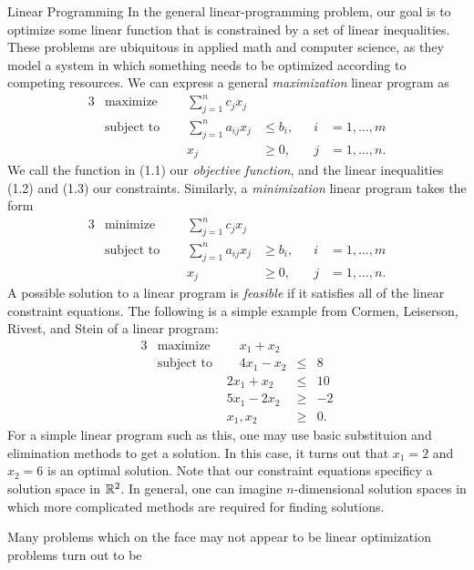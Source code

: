 \begin{section}{Linear Programming}
	In the general linear-programming problem, our goal is to optimize some linear function that 
	is constrained by a set of linear inequalities. These problems are ubiquitous in applied math 
	and computer science, as they model a system in which something needs to be optimized according 
	to competing resources. We can express a general \emph{maximization} linear program as
	\begin{alignat}{3}
		& \text{maximize } & \sum_{j=1}^{n} c_{j} x_{j}& \\
		& \text{subject to } \quad & \sum_{j=1}^{n} a_{ij} x_{j} & \leq b_{i}, & i & = 1, \dots 
		, m \\
				&& x_{j} & \geq 0, \quad & j & = 1, \dots, n.
	\end{alignat}
	We call the function in (1.1) our \emph{objective function}, and the linear inequalities (1.2) 
	and (1.3) our constraints. Similarly, a \emph{minimization} linear program takes the form
	\begin{alignat}{3}
		& \text{minimize } & \sum_{j=1}^{n} c_{j} x_{j}& \\
		& \text{subject to } \quad & \sum_{j=1}^{n} a_{ij} x_{j} & \geq b_{i}, & i & = 1, \dots 
		, m \\
				&& x_{j} & \geq 0, \quad & j & = 1, \dots, n.
	\end{alignat}
	A possible solution to a linear program is \emph{feasible} if it satisfies all of the linear 
	constraint equations. The following is a simple example from Cormen, Leiserson, Rivest, 
	and Stein \cite{cormen2009introduction} of a linear program:
	\begin{alignat*}{3}
		& \text{maximize } &\quad x_1 + x_2 & \\
		& \text{subject to } &\quad 4x_1 - x_2 &\leq &8 \\
				     && 2x_1 + x_2 &\leq &10 \\
				     && 5x_1 - 2x_2 &\geq &-2 \\
				     && x_1,x_2 & \geq &0.
	\end{alignat*}
	For a simple linear program such as this, one may use basic substituion and elimination methods 
	to get a solution. In this case, it turns out that $x_1 = 2$ and $x_2 = 6$ is an optimal 
	solution. Note that our 
	constraint equations specificy a solution space in $\mathbb{R}^2$. In general, one can imagine 
	$n$-dimensional solution spaces in which more complicated methods are required for 
	finding solutions.

\end{section}
	Many problems which on the face may not appear to be linear optimization problems turn out to be 
